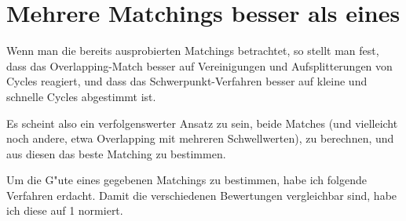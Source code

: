 \documentclass[a4paper,10pt,twoside]{scrreprt}
\begin{document}
\section{Mehrere Matchings besser als eines}

Wenn man die bereits ausprobierten Matchings betrachtet, so stellt man fest, dass das Overlapping-Match besser auf Vereinigungen und Aufsplitterungen von Cycles reagiert, und dass das Schwerpunkt-Verfahren besser auf kleine und schnelle Cycles abgestimmt ist. 

Es scheint also ein verfolgenswerter Ansatz zu sein, beide Matches (und vielleicht noch andere, etwa Overlapping mit mehreren Schwellwerten), zu berechnen, und aus diesen das beste Matching zu bestimmen. 

Um die G"ute eines gegebenen Matchings zu bestimmen, habe ich folgende Verfahren erdacht. Damit die verschiedenen Bewertungen vergleichbar sind, habe ich diese auf 1 normiert.
\end{document}
